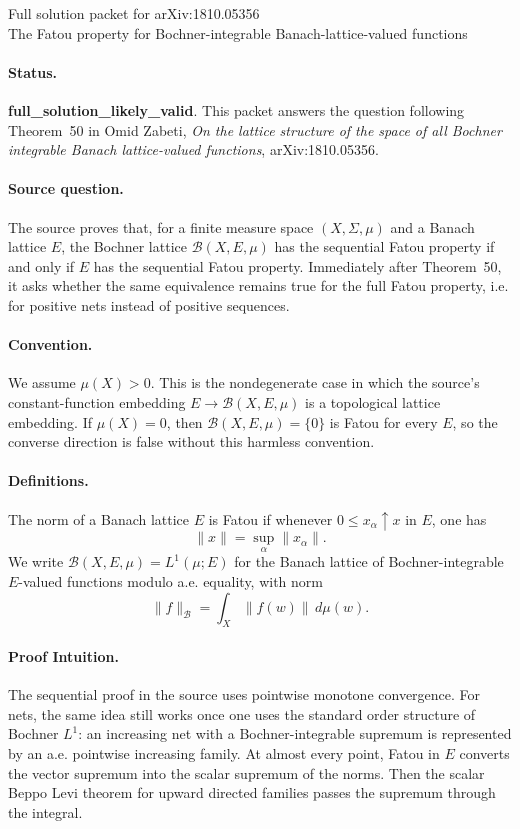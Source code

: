\documentclass[11pt]{article}
\newcommand{\B}{\mathcal B}
\begin{document}
\begin{center}
{\Large Full solution packet for arXiv:1810.05356}\\[4pt]
{\large The Fatou property for Bochner-integrable Banach-lattice-valued functions}
\end{center}

\paragraph{Status.}
\textbf{full\_solution\_likely\_valid}.  This packet answers the question
following Theorem~50 in Omid Zabeti, \emph{On the lattice structure of the
space of all Bochner integrable Banach lattice-valued functions},
arXiv:1810.05356.

\paragraph{Source question.}
The source proves that, for a finite measure space $(X,\Sigma,\mu)$ and a
Banach lattice $E$, the Bochner lattice $\B(X,E,\mu)$ has the sequential Fatou
property if and only if $E$ has the sequential Fatou property.  Immediately
after Theorem~50, it asks whether the same equivalence remains true for the
full Fatou property, i.e. for positive nets instead of positive sequences.

\paragraph{Convention.}
We assume $\mu(X)>0$.  This is the nondegenerate case in which the source's
constant-function embedding $E\to \B(X,E,\mu)$ is a topological lattice
embedding.  If $\mu(X)=0$, then $\B(X,E,\mu)=\{0\}$ is Fatou for every $E$, so
the converse direction is false without this harmless convention.

\paragraph{Definitions.}
The norm of a Banach lattice $E$ is Fatou if whenever $0\leq x_\alpha\uparrow x$
in $E$, one has
\[
  \|x\|=\sup_\alpha \|x_\alpha\|.
\]
We write $\B(X,E,\mu)=L^1(\mu;E)$ for the Banach lattice of Bochner-integrable
$E$-valued functions modulo a.e. equality, with norm
\[
  \|f\|_{\B}=\int_X \|f(w)\|\,d\mu(w).
\]

\paragraph{Proof Intuition.}
The sequential proof in the source uses pointwise monotone convergence.  For
nets, the same idea still works once one uses the standard order structure of
Bochner $L^1$: an increasing net with a Bochner-integrable supremum is
represented by an a.e. pointwise increasing family.  At almost every point,
Fatou in $E$ converts the vector supremum into the scalar supremum of the
norms.  Then the scalar Beppo Levi theorem for upward directed families
passes the supremum through the integral.
\end{document}
